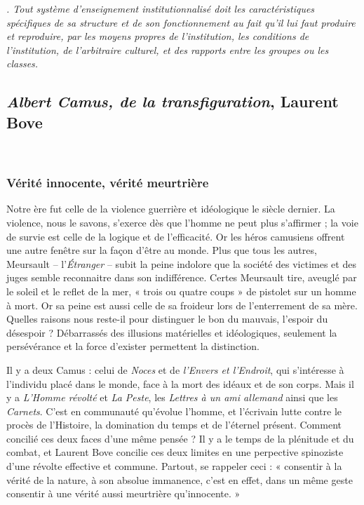 \documentclass[11pt]{amsart}
\begin{document}
\textsl{. Tout \emph{système d'enseignement institutionnalisé} doit les caractéristiques spécifiques de sa structure et de son fonctionnement au fait qu'il lui faut produire et reproduire, par les moyens propres de l'institution, les conditions de l'institution, de l'arbitraire culturel, et des rapports entre les groupes ou les classes.}

\newpage 

\subsection*{\textsl{Albert Camus, de la transfiguration}, Laurent Bove}$ $\\

\subsubsection{Vérité innocente, vérité meurtrière} 
Notre ère fut celle de la violence guerrière et idéologique le siècle dernier. La violence, nous le savons, s'exerce dès que l'homme ne peut plus s'affirmer ; la voie de survie est celle de la logique et de l'efficacité. Or les héros camusiens offrent une autre fenêtre sur la façon d'être au monde. Plus que tous les autres, Meursault – l'\textsl{\'Etranger} – subit la peine indolore que la société des victimes et des juges semble reconnaitre dans son indifférence. Certes Meursault tire, aveuglé par le soleil et le reflet de la mer, « trois ou quatre coups » de pistolet sur un homme à mort. Or sa peine est aussi celle de sa froideur lors de l'enterrement de sa mère. Quelles raisons nous reste-il pour distinguer le bon du mauvais, l'espoir du désespoir ? Débarrassés des illusions matérielles et idéologiques, seulement la persévérance et la force d'exister permettent la distinction.

Il y a deux Camus : celui de \textsl{Noces} et de \textsl{l'Envers et l'Endroit}, qui s'intéresse à l'individu placé dans le monde, face à la mort des idéaux et de son corps. Mais il y a \textsl{L'Homme révolté} et \textsl{La Peste}, les \textsl{Lettres à un ami allemand} ainsi que les \textsl{Carnets}. C'est en communauté qu'évolue l'homme, et l'écrivain lutte contre le procès de l'Histoire, la domination du temps et de l'éternel présent. Comment concilié ces deux faces d'une même pensée ? Il y a le temps de la plénitude et du combat, et Laurent Bove concilie ces deux limites en une perpective spinoziste d'une révolte effective et commune. Partout, se rappeler ceci : « consentir à la vérité de la nature, à son absolue immanence, c'est en effet, dans un même geste consentir à une vérité aussi meurtrière qu'innocente. » 
\end{document}
